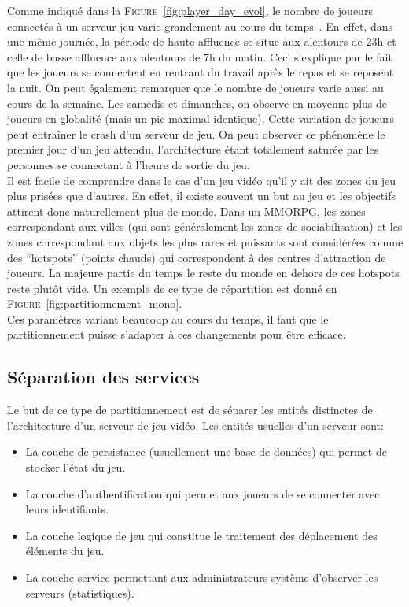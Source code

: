 Comme indiqué dans la \textsc{Figure}~\ref{fig:player_day_evol}, le nombre de joueurs connectés à un serveur jeu varie grandement au cours du temps~\cite{is_server_consolidation_benefical}. En effet, dans une même journée, la période de haute affluence se situe aux alentours de 23h et celle de basse affluence aux alentours de 7h du matin. Ceci s'explique par le fait que les joueurs se connectent en rentrant du travail après le repas et se reposent la nuit. On peut également remarquer que le nombre de joueurs varie aussi au cours de la semaine. Les samedis et dimanches, on observe en moyenne plus de joueurs en globalité (mais un pic maximal identique). Cette variation de joueurs peut entraîner le crash d'un serveur de jeu. On peut observer ce phénomène le premier jour d'un jeu attendu, l'architecture étant totalement saturée par les personnes se connectant à l'heure de sortie du jeu.\\

Il est facile de comprendre dans le cas d'un jeu vidéo qu'il y ait des zones du jeu plus prisées que d'autres. En effet, il existe souvent un but au jeu et les objectifs attirent donc naturellement plus de monde. Dans un MMORPG, les zones correspondant aux villes (qui sont généralement les zones de sociabilisation) et les zones correspondant aux objets les plus rares et puissants sont considérées comme des ``hotspots'' (points chauds) qui correspondent à des centres d'attraction de joueurs. La majeure partie du temps le reste du monde en dehors de ces hotspots reste plutôt vide. Un exemple de ce type de répartition est donné en \textsc{Figure}~\ref{fig:partitionnement_mono}.\\

Ces paramètres variant beaucoup au cours du temps, il faut que le partitionnement puisse s'adapter à ces changements pour être efficace.

\subsection{Séparation des services}
Le but de ce type de partitionnement est de séparer les entités distinctes de l'architecture d'un serveur de jeu vidéo. Les entités usuelles d'un serveur sont:\\

\begin{itemize}
	\item La couche de persistance (usuellement une base de données) qui permet de stocker l'état du jeu.
	\item La couche d'authentification qui permet aux joueurs de se connecter avec leurs identifiants.
	\item La couche logique de jeu qui constitue le traitement des déplacement des éléments du jeu.
	\item La couche service permettant aux administrateurs système d'observer les serveurs (statistiques).\\
\end{itemize}

